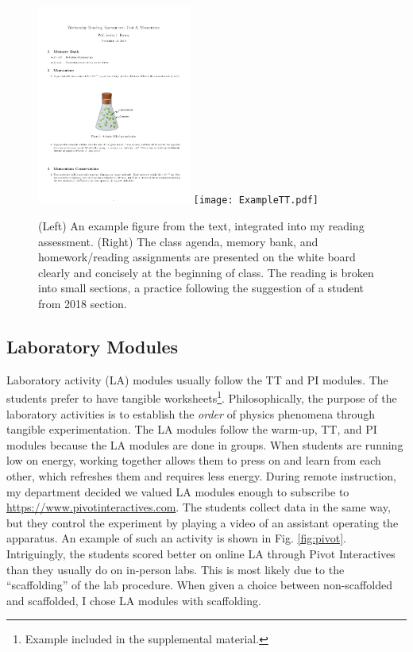 \documentclass[../../../main.tex]{subfiles}
\begin{document}
\begin{figure}
\centering
\includegraphics[width=0.45\textwidth]{figures/readingassessment.png}
\texttt{[image: ExampleTT.pdf]}
\caption{\label{fig:read} (Left) An example figure from the text, integrated into my reading assessment.  (Right) The class agenda, memory bank, and homework/reading assignments are presented on the white board clearly and concisely at the beginning of class.  The reading is broken into small sections, a practice following the suggestion of a student from 2018 section.}
\end{figure}

\subsection{Laboratory Modules}
\label{sec:la}

Laboratory activity (LA) modules usually follow the TT and PI modules.  The students prefer to have tangible worksheets\footnote{Example included in the supplemental material.}.  Philosophically, the purpose of the laboratory activities is to establish the \textit{order} of physics phenomena through tangible experimentation.  The LA modules follow the warm-up, TT, and PI modules because the LA modules are done in groups.  When students are running low on energy, working together allows them to press on and learn from each other, which refreshes them and requires less energy.  During remote instruction, my department decided we valued LA modules enough to subscribe to \url{https://www.pivotinteractives.com}.  The students collect data in the same way, but they control the experiment by playing a video of an assistant operating the apparatus.  An example of such an activity is shown in Fig. \ref{fig:pivot}.  Intriguingly, the students scored better on online LA through Pivot Interactives than they usually do on in-person labs.  This is most likely due to the ``scaffolding'' of the lab procedure.  When given a choice between non-scaffolded and scaffolded, I chose LA modules with scaffolding.
\end{document}
